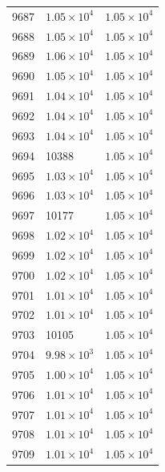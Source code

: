 \begin{table}[H]
\begin{tabular}{lll}
9687 & $\displaystyle 1.05 \times 10^{4}$ & $\displaystyle 1.05 \times 10^{4}$ \\
9688 & $\displaystyle 1.05 \times 10^{4}$ & $\displaystyle 1.05 \times 10^{4}$ \\
9689 & $\displaystyle 1.06 \times 10^{4}$ & $\displaystyle 1.05 \times 10^{4}$ \\
9690 & $\displaystyle 1.05 \times 10^{4}$ & $\displaystyle 1.05 \times 10^{4}$ \\
9691 & $\displaystyle 1.04 \times 10^{4}$ & $\displaystyle 1.05 \times 10^{4}$ \\
9692 & $\displaystyle 1.04 \times 10^{4}$ & $\displaystyle 1.05 \times 10^{4}$ \\
9693 & $\displaystyle 1.04 \times 10^{4}$ & $\displaystyle 1.05 \times 10^{4}$ \\
9694 & 10388 & $\displaystyle 1.05 \times 10^{4}$ \\
9695 & $\displaystyle 1.03 \times 10^{4}$ & $\displaystyle 1.05 \times 10^{4}$ \\
9696 & $\displaystyle 1.03 \times 10^{4}$ & $\displaystyle 1.05 \times 10^{4}$ \\
9697 & 10177 & $\displaystyle 1.05 \times 10^{4}$ \\
9698 & $\displaystyle 1.02 \times 10^{4}$ & $\displaystyle 1.05 \times 10^{4}$ \\
9699 & $\displaystyle 1.02 \times 10^{4}$ & $\displaystyle 1.05 \times 10^{4}$ \\
9700 & $\displaystyle 1.02 \times 10^{4}$ & $\displaystyle 1.05 \times 10^{4}$ \\
9701 & $\displaystyle 1.01 \times 10^{4}$ & $\displaystyle 1.05 \times 10^{4}$ \\
9702 & $\displaystyle 1.01 \times 10^{4}$ & $\displaystyle 1.05 \times 10^{4}$ \\
9703 & 10105 & $\displaystyle 1.05 \times 10^{4}$ \\
9704 & $\displaystyle 9.98 \times 10^{3}$ & $\displaystyle 1.05 \times 10^{4}$ \\
9705 & $\displaystyle 1.00 \times 10^{4}$ & $\displaystyle 1.05 \times 10^{4}$ \\
9706 & $\displaystyle 1.01 \times 10^{4}$ & $\displaystyle 1.05 \times 10^{4}$ \\
9707 & $\displaystyle 1.01 \times 10^{4}$ & $\displaystyle 1.05 \times 10^{4}$ \\
9708 & $\displaystyle 1.01 \times 10^{4}$ & $\displaystyle 1.05 \times 10^{4}$ \\
9709 & $\displaystyle 1.01 \times 10^{4}$ & $\displaystyle 1.05 \times 10^{4}$ \\

\end{tabular}
\end{table}
